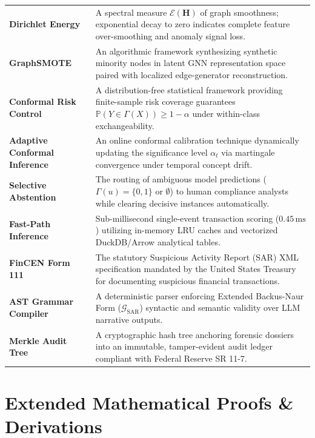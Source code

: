 \begin{table}[H]
\begin{tabularx}{\textwidth}{@{}>{\raggedright\arraybackslash\bfseries}p{3.55cm} >{\raggedright\arraybackslash}X@{}}
Dirichlet Energy & A spectral measure $\mathcal{E}(\mathbf{H})$ of graph smoothness; exponential decay to zero indicates complete feature over-smoothing and anomaly signal loss. \\
GraphSMOTE & An algorithmic framework synthesizing synthetic minority nodes in latent GNN representation space paired with localized edge-generator reconstruction. \\
Conformal Risk Control & A distribution-free statistical framework providing finite-sample risk coverage guarantees $\mathbb{P}(Y \in \Gamma(X)) \ge 1 - \alpha$ under within-class exchangeability. \\
Adaptive Conformal Inference & An online conformal calibration technique dynamically updating the significance level $\alpha_t$ via martingale convergence under temporal concept drift. \\
Selective Abstention & The routing of ambiguous model predictions ($\Gamma(u) = \{0, 1\}$ or $\emptyset$) to human compliance analysts while clearing decisive instances automatically. \\
Fast-Path Inference & Sub-millisecond single-event transaction scoring ($0.45\,\text{ms}$) utilizing in-memory LRU caches and vectorized DuckDB/Arrow analytical tables. \\
FinCEN Form 111 & The statutory Suspicious Activity Report (SAR) XML specification mandated by the United States Treasury for documenting suspicious financial transactions. \\
AST Grammar Compiler & A deterministic parser enforcing Extended Backus-Naur Form ($\mathcal{G}_{\text{SAR}}$) syntactic and semantic validity over LLM narrative outputs. \\
Merkle Audit Tree & A cryptographic hash tree anchoring forensic dossiers into an immutable, tamper-evident audit ledger compliant with Federal Reserve SR 11-7. \\
\bottomrule
\end{tabularx}
\end{table}

\chapter{Extended Mathematical Proofs \& Derivations}
\label{app:proofs}


